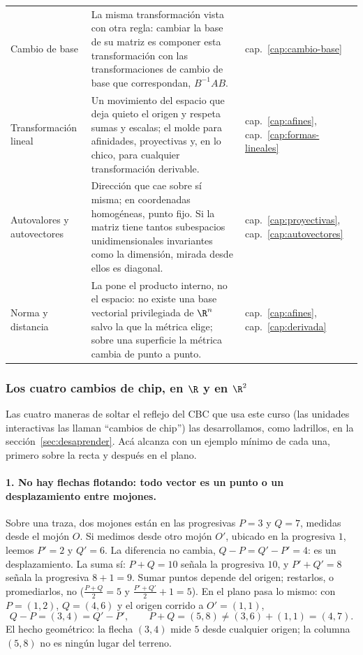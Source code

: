 {\begin{tabularx}{\textwidth}{>{\raggedright\arraybackslash}p{30mm} Y >{\raggedright\arraybackslash}p{17mm}}
Cambio de base &
La misma transformación vista con otra regla: cambiar la base de su matriz es componer
esta transformación con las transformaciones de cambio de base que correspondan,
\(B^{-1}AB\). &
cap.~\ref{cap:cambio-base}\\
Transformación lineal &
Un movimiento del espacio que deja quieto el origen y respeta sumas y escalas; el molde
para afinidades, proyectivas y, en lo chico, para cualquier transformación derivable. &
cap.~\ref{cap:afines}, cap.~\ref{cap:formas-lineales}\\
Autovalores y autovectores &
Dirección que cae sobre sí misma; en coordenadas homogéneas, punto fijo. Si la matriz tiene
tantos subespacios unidimensionales invariantes como la dimensión,
mirada desde ellos es diagonal. &
cap.~\ref{cap:proyectivas}, cap.~\ref{cap:autovectores}\\
Norma y distancia &
La pone el producto interno, no el espacio: no existe una base vectorial privilegiada de
\(\R^n\) salvo la que la métrica elige; sobre una superficie la
métrica cambia de punto a punto. &
cap.~\ref{cap:afines}, cap.~\ref{cap:derivada}\\
\bottomrule
\end{tabularx}
}

\subsubsection*{Los cuatro cambios de chip, en \(\R\) y en \(\R^2\)}

Las cuatro maneras de soltar el reflejo del CBC que usa este curso (las unidades
interactivas las llaman ``cambios de chip'') las desarrollamos, como ladrillos, en la
sección~\ref{sec:desaprender}. Acá alcanza con un ejemplo mínimo de cada una, primero sobre
la recta y después en el plano.

\paragraph{1. No hay flechas flotando: todo vector es un punto o un desplazamiento entre
mojones.}
Sobre una traza, dos mojones están en las progresivas \(P=3\) y \(Q=7\), medidas desde el
mojón \(O\). Si medimos desde otro mojón \(O'\), ubicado en la progresiva \(1\), leemos
\(P'=2\) y \(Q'=6\). La diferencia no cambia, \(Q-P=Q'-P'=4\): es un desplazamiento. La suma
sí: \(P+Q=10\) señala la progresiva \(10\), y \(P'+Q'=8\) señala la progresiva \(8+1=9\).
Sumar puntos depende del origen; restarlos, o promediarlos, no
(\(\tfrac{P+Q}{2}=5\) y \(\tfrac{P'+Q'}{2}+1=5\)). En el plano pasa lo mismo: con
\(P=(1,2)\), \(Q=(4,6)\) y el origen corrido a \(O'=(1,1)\),
\[
  Q-P=(3,4)=Q'-P',\qquad P+Q=(5,8)\neq(3,6)+(1,1)=(4,7).
\]
El hecho geométrico: la flecha \((3,4)\) mide \(5\) desde cualquier origen; la columna
\((5,8)\) no es ningún lugar del terreno.

